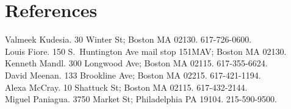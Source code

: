 \documentclass[10pt]{article}
\begin{document}
\section*{References}
Valmeek Kudesia. 30 Winter St; Boston MA 02130. 617-726-0600.\\
Louis Fiore. 150 S.\ Huntington Ave mail stop 151MAV; Boston MA
02130.\\
Kenneth Mandl. 300 Longwood Ave; Boston MA 02115. 617-355-6624.\\
David Meenan. 133 Brookline Ave; Boston MA 02215. 617-421-1194.\\
Alexa McCray. 10 Shattuck St; Boston MA 02115. 617-432-2144.\\
Miguel Paniagua. 3750 Market St; Philadelphia PA 19104. 215-590-9500.
\end{document}
